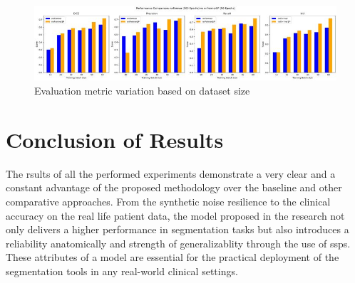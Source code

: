 \begin{figure}[htb!] %
\centering
\centering
\includegraphics[width=1\textwidth]{images/datasets.jpeg}
\caption{\centering Evaluation metric variation based on dataset size}
\label{Fig:datasets}
\end{figure}

\section{Conclusion of Results}
The rsults of all the performed experiments demonstrate a very clear and a constant advantage of the proposed methodology over the baseline and other comparative approaches. From the synthetic noise resilience to the clinical accuracy on the real life patient data, the model proposed in the research not only delivers a higher performance in segmentation tasks but also introduces a reliability anatomically and strength of generalizablity through the use of \gls{ssp}s. These attributes of a model are essential for the practical deployment of the segmentation tools in any real-world clinical settings.
